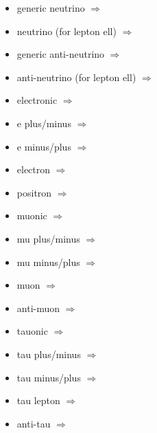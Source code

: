 \begin{multicols}{2}
{\begin{itemize}
\item generic neutrino\newline {} $\Rightarrow$ \Pgn
\item neutrino (for lepton ell)\newline {} $\Rightarrow$ \Pgnl
\item generic anti-neutrino\newline {} $\Rightarrow$ \Pagn
\item anti-neutrino (for lepton ell)\newline {} $\Rightarrow$ \Pagnl
\item electronic\newline {} $\Rightarrow$ \Pe
\item e plus/minus\newline {} $\Rightarrow$ \Pepm
\item e minus/plus\newline {} $\Rightarrow$ \Pemp
\item electron\newline {} $\Rightarrow$ \Pem
\item positron\newline {} $\Rightarrow$ \Pep
\item muonic\newline {} $\Rightarrow$ \Pgm
\item mu plus/minus\newline {} $\Rightarrow$ \Pgmpm
\item mu minus/plus\newline {} $\Rightarrow$ \Pgmmp
\item muon\newline {} $\Rightarrow$ \Pgmm
\item anti-muon\newline {} $\Rightarrow$ \Pgmp
\item tauonic\newline {} $\Rightarrow$ \Pgt
\item tau plus/minus\newline {} $\Rightarrow$ \Pgtpm
\item tau minus/plus\newline {} $\Rightarrow$ \Pgtmp
\item tau lepton\newline {} $\Rightarrow$ \Pgtm
\item anti-tau\newline {} $\Rightarrow$ \Pgtp

\end{itemize}}
\end{multicols}
